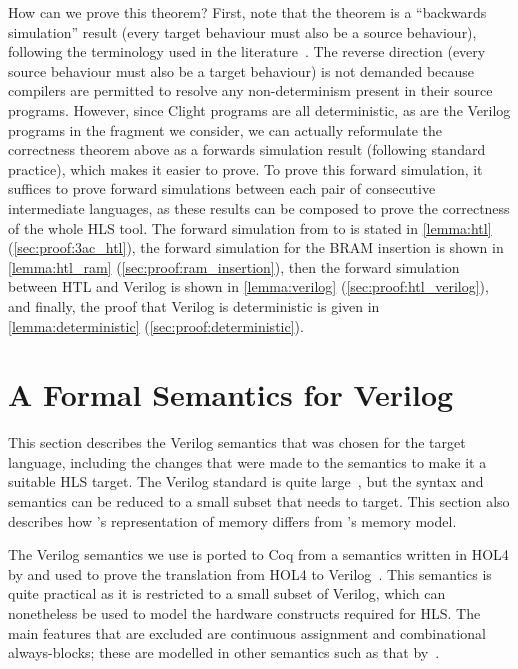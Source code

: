 How can we prove this theorem? First, note that the theorem is a
\enquote{backwards simulation} result (every target behaviour must also be a
source behaviour), following the terminology used in the \compcert{}
literature~\cite{leroy09_formal_verif_realis_compil}. The reverse direction
(every source behaviour must also be a target behaviour) is not demanded because
compilers are permitted to resolve any non-determinism present in their source
programs. However, since Clight programs are all deterministic, as are the
Verilog programs in the fragment we consider, we can actually reformulate the
correctness theorem above as a forwards simulation result (following standard
\compcert{} practice), which makes it easier to prove.  To prove this forward
simulation, it suffices to prove forward simulations between each pair of
consecutive intermediate languages, as these results can be composed to prove
the correctness of the whole HLS tool.  The forward simulation from \rtl{} to
\htl{} is stated in \cref{lemma:htl} (\cref{sec:proof:3ac_htl}), the forward
simulation for the \gls{BRAM} insertion is shown in \cref{lemma:htl_ram}
(\cref{sec:proof:ram_insertion}), then the forward simulation between HTL and
Verilog is shown in \cref{lemma:verilog} (\cref{sec:proof:htl_verilog}), and
finally, the proof that Verilog is deterministic is given in
\cref{lemma:deterministic} (\cref{sec:proof:deterministic}).

\section{A Formal Semantics for Verilog}\label{sec:verilog}


This section describes the Verilog semantics that was chosen for the target language, including the changes that were made to the semantics to make it a suitable HLS target.  The Verilog standard is quite large~\cite{06_ieee_stand_veril_hardw_descr_languag,05_ieee_stand_veril_regis_trans_level_synth}, but the syntax and semantics can be reduced to a small subset that \vericert{} needs to target.  This section  also describes how \vericert{}'s representation of memory differs from \compcert{}'s memory model.

The Verilog semantics we use is ported to Coq from a semantics written in HOL4
by \textcite{lööw19_proof_trans_veril_devel_hol} and used to prove the
translation from HOL4 to
Verilog~\cite{lööw19_verif_compil_verif_proces}. %
This semantics is quite practical as it is restricted to a small subset of
Verilog, which can nonetheless be used to model the hardware constructs required
for HLS.  The main features that are excluded are continuous assignment and
combinational always-blocks; these are modelled in other semantics such as that
by~\textcite{meredith10_veril}. %

